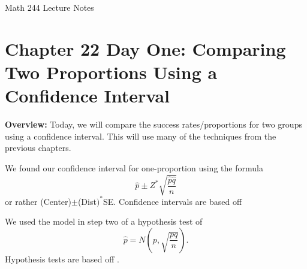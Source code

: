 \documentclass[12pt]{amsart}
\date{}
\theoremstyle{definition}
\begin{document}
\newcommand{\ph}{\phantom}
\newcommand{\ds}{\displaystyle}

\renewcommand{\emph}{\textbf}
\onehalfspace


\fancyhf{}   %
\renewcommand{\headrulewidth}{0.4pt} %
\fancyfootoffset[LE,LO]{0in}        %
\renewcommand{\footrulewidth}{0.4pt} %




\begin{center}

	\larger[3]	Math 244 Lecture Notes \smaller[3]		\\[22pt]

\end{center}

\section*{Chapter 22 Day One: Comparing Two Proportions Using a Confidence Interval}




 \textbf{Overview:} Today, we will compare the success rates/proportions for two groups using a confidence interval. This will use many of the techniques from the previous chapters.
 ~\\
 
 \begin{framed}
  We found our confidence interval for one-proportion using the formula $$\hat{p}\pm Z^*\sqrt{\frac{\hat{p}\hat{q}}{n}}$$ or rather (Center)$\pm$(Dist$)^*$SE. Confidence intervals are based off \underline{\hspace{1in}}
 \end{framed}
 
\begin{framed}
We used the model in step two of a hypothesis test of $$\hat{p}=N\left(p,\sqrt{\frac{pq}{n}} \right).$$ Hypothesis tests are based off \underline{\hspace{1in}}.
\end{framed}
\end{document}
